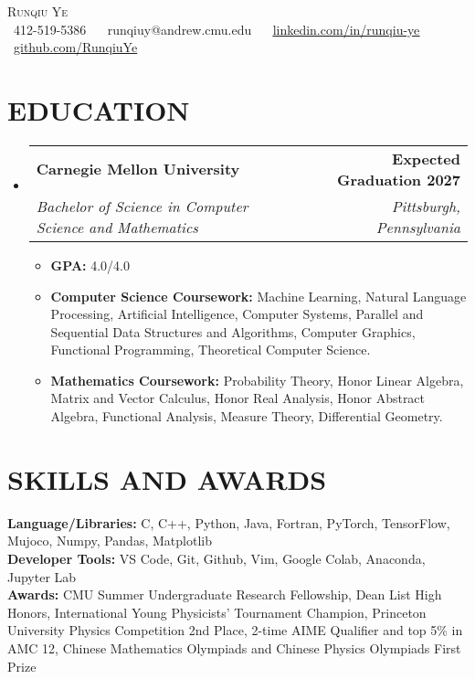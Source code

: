 \documentclass[letterpaper,11pt]{article}
\makeatletter
\newcommand{\resumeItem}[1]{
  \item\small{
    {#1 \vspace{-2pt}}
  }
}
\newcommand{\resumeSubheading}[4]{
  \vspace{-2pt}\item
    \begin{tabular*}{1.0\textwidth}[t]{l@{\extracolsep{\fill}}r}
      {#1} & \textbf{\small #2} \\
      \textit{\small#3} & \textit{\small #4} \\
    \end{tabular*}\vspace{-7pt}
}
\newcommand{\resumeSubHeadingListStart}{\begin{itemize}[leftmargin=0.0in, label={}]}
\newcommand{\resumeSubHeadingListEnd}{\end{itemize}}
\newcommand{\resumeItemListStart}{\begin{itemize}[leftmargin=0.20in]}
\newcommand{\resumeItemListEnd}{\end{itemize}\vspace{-5pt}}
\makeatother
\begin{document}

\begin{center}
    {\Huge \scshape Runqiu Ye} \\ \vspace{5pt}
    \small \raisebox{-0.1\height}\faPhone\ 412-519-5386 ~ 
    {\raisebox{-0.1\height}\faEnvelope\ 
    {runqiuy@andrew.cmu.edu}} ~ 
    {\raisebox{-0.1\height}\faLinkedin\ 
    \href{https://www.linkedin.com/in/runqiu-ye/}
    {\underline{linkedin.com/in/runqiu-ye}}}  ~
    {\raisebox{-0.1\height}\faGithub\ 
    \href{https://github.com/RunqiuYe}
    {\underline{github.com/RunqiuYe}}}
\end{center}
\vspace{-5pt}


\section{EDUCATION}
\resumeSubHeadingListStart
\resumeSubheading
  {\textbf{Carnegie Mellon University}}{Expected Graduation 2027}
  {Bachelor of Science in Computer Science and Mathematics}
  {Pittsburgh, Pennsylvania}
\resumeItemListStart
\resumeItem{\textbf{GPA:} 4.0/4.0}
\resumeItem{\textbf{Computer Science Coursework:} Machine Learning, 
Natural Language Processing, Artificial Intelligence, 
Computer Systems, Parallel and Sequential Data 
Structures and Algorithms, Computer Graphics,
Functional Programming, Theoretical Computer Science.}
\resumeItem{\textbf{Mathematics Coursework:} 
Probability Theory, Honor Linear Algebra, 
Matrix and Vector Calculus, Honor Real Analysis, 
Honor Abstract Algebra, Functional 
Analysis, Measure Theory, Differential Geometry.}
\resumeItemListEnd
\resumeSubHeadingListEnd

\vspace{-10pt}

\section{SKILLS AND AWARDS}
\begin{itemize}[leftmargin=0in, label={}]
  \small{\item{
   \textbf{Language/Libraries:} C, C++, Python, Java, Fortran, 
   PyTorch, TensorFlow, Mujoco, Numpy, Pandas, Matplotlib \\
   \textbf{Developer Tools:} VS Code, Git, Github, Vim, 
   Google Colab, Anaconda, Jupyter Lab \\
   \textbf{Awards:} CMU Summer Undergraduate Research 
   Fellowship, Dean List High Honors, International 
   Young Physicists' Tournament Champion, Princeton 
   University Physics Competition 2nd Place, 
   2-time AIME Qualifier and top 5\% in AMC 12, 
   Chinese Mathematics Olympiads and Chinese Physics 
   Olympiads First Prize \\
  }}
\end{itemize}
\vspace{-16pt}
\end{document}
